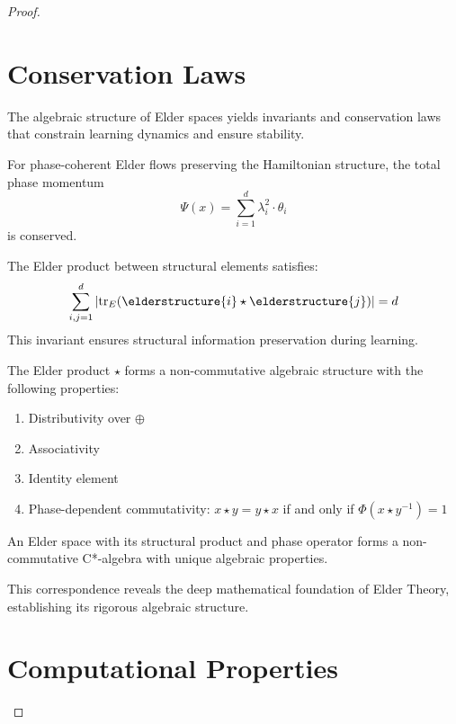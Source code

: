 \begin{proof}
\section{Conservation Laws}

The algebraic structure of Elder spaces yields invariants and conservation laws that constrain learning dynamics and ensure stability.

\begin{theorem}
For phase-coherent Elder flows preserving the Hamiltonian structure, the total phase momentum
\begin{equation}
\Psi(x) = \sum_{i=1}^{d} \lambda_i^2 \cdot \theta_i
\end{equation}
is conserved.
\end{theorem}

\begin{theorem}
The Elder product between structural elements satisfies:
\begin{equation}
\sum_{i,j=1}^{d} |\mathrm{tr}_E(\elderstructure{i} \star \elderstructure{j})| = d
\end{equation}
This invariant ensures structural information preservation during learning.
\end{theorem}

The Elder product $\star$ forms a non-commutative algebraic structure with the following properties:
\begin{enumerate}
    \item Distributivity over $\oplus$
    \item Associativity
    \item Identity element
    \item Phase-dependent commutativity: $x \star y = y \star x$ if and only if $\Phi(x \star y^{-1}) = 1$
\end{enumerate}

\begin{theorem}
\label{thm:elder-structural}
An Elder space with its structural product and phase operator forms a non-commutative C*-algebra with unique algebraic properties.
\end{theorem}

This correspondence reveals the deep mathematical foundation of Elder Theory, establishing its rigorous algebraic structure.

\section{Computational Properties}


\end{proof}
